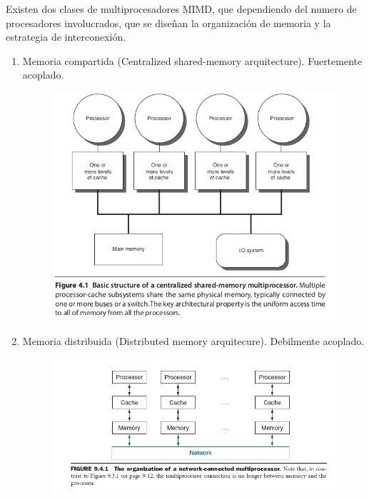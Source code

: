 \documentclass{article}
\begin{document}
Existen dos clases de multiprocesadores MIMD, que dependiendo del numero de procesadores involucrados, que se diseñan la organización de memoria y la estrategia de interconexión.
\begin{enumerate}
    \item Memoria compartida (Centralized shared-memory arquitecture). Fuertemente acoplado.
    \begin{figure}[h!]
        \includegraphics[width=\linewidth]{imagenes/paralelo/memoria-compartida.png}
    \end{figure}

    \item Memoria distribuida (Distributed memory arquitecure). Debilmente acoplado.
    \begin{figure}[h!]
        \includegraphics[width=\linewidth]{imagenes/paralelo/memoria-distribuida.png}
    \end{figure}
\end{enumerate} 
\end{document}
